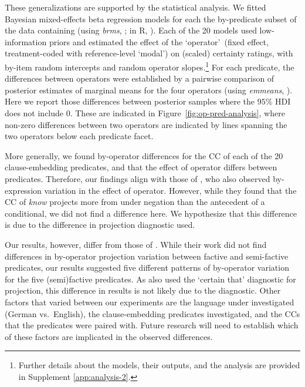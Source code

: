 \documentclass[a4paper,12pt,twoside]{article}
\begin{document}
        These generalizations are supported by the statistical analysis. We fitted Bayesian mixed-effects beta regression models for each the by-predicate subset of the data containing (using \emph{brms}, \citealt{burkner_brms_2017}; in R, \citealt{r}). Each of the 20 models used low-information priors and estimated the effect of the \lq operator\rq\ (fixed effect, treatment-coded with reference-level \lq modal\rq) on (scaled) certainty ratings, with by-item random intercepts and random operator slopes.\footnote{Further details about the models, their outputs, and the analysis are provided in Supplement \ref{app:analysis-2}.} For each predicate, the differences between operators were established by a pairwise comparison of posterior estimates of marginal means for the four operators (using \emph{emmeans}, \citealt{lenth_emmeans_2024}). Here we report those differences between posterior samples where the $95\%$ HDI does not include $0$. These are indicated in Figure~\ref{fig:op-pred-analysis}, where non-zero differences between two operators are indicated by lines spanning the two operators below each predicate facet.

        More generally, we found by-operator differences for the CC of each of the 20 clause-embedding predicates, and that the effect of operator differs between predicates.
        Therefore, our findings align with those of \citealt{smith_relationship_2014}, who also observed by-expression variation in the effect of operator. However, while they found that the CC of \emph{know} projects more from under negation than the antecedent of a conditional, we did not find a difference here. We hypothesize that this difference is due to the difference in projection diagnostic used. 
        
        Our results, however, differ from those of \citealt{sieker_projective_2022}. While their work did not find differences in by-operator projection variation between factive and semi-factive predicates, our results suggested five different patterns of by-operator variation for the five (semi)factive predicates. As \citealt{sieker_projective_2022} also used the `certain that' diagnostic for projection, this difference in results is not likely due to the diagnostic. Other factors that varied between our experiments are the language under investigated (German vs.\ English), the clause-embedding predicates investigated, and the CCs that the predicates were paired with. Future research will need to establish which of these factors are implicated in the observed differences.
   
\end{document}
